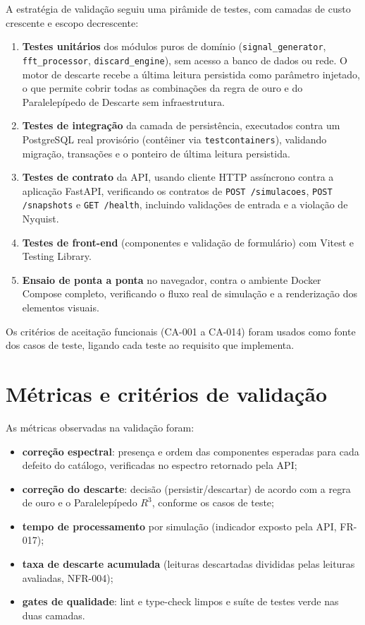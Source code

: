 A estratégia de validação seguiu uma pirâmide de testes, com camadas de custo
crescente e escopo decrescente:

\begin{enumerate}
  \item \textbf{Testes unitários} dos módulos puros de domínio
  (\texttt{signal\_generator}, \texttt{fft\_processor}, \texttt{discard\_engine}), sem acesso a banco
  de dados ou rede. O motor de descarte recebe a última leitura persistida como
  parâmetro injetado, o que permite cobrir todas as combinações da regra de ouro
  e do Paralelepípedo de Descarte sem infraestrutura.
  \item \textbf{Testes de integração} da camada de persistência, executados
  contra um PostgreSQL real provisório (contêiner via \texttt{testcontainers}),
  validando migração, transações e o ponteiro de última leitura persistida.
  \item \textbf{Testes de contrato} da API, usando cliente HTTP assíncrono
  contra a aplicação FastAPI, verificando os contratos de \texttt{POST /simulacoes},
  \texttt{POST /snapshots} e \texttt{GET /health}, incluindo validações de entrada e a
  violação de Nyquist.
  \item \textbf{Testes de front-end} (componentes e validação de formulário)
  com Vitest e Testing Library.
  \item \textbf{Ensaio de ponta a ponta} no navegador, contra o ambiente
  Docker Compose completo, verificando o fluxo real de simulação e a renderização
  dos elementos visuais.
\end{enumerate}

Os critérios de aceitação funcionais (CA-001 a CA-014) foram usados como
fonte dos casos de teste, ligando cada teste ao requisito que implementa.

\section{Métricas e critérios de validação}

As métricas observadas na validação foram:

\begin{itemize}
  \item \textbf{correção espectral}: presença e ordem das componentes
  esperadas para cada defeito do catálogo, verificadas no espectro retornado
  pela API;
  \item \textbf{correção do descarte}: decisão (persistir/descartar) de acordo
  com a regra de ouro e o Paralelepípedo \(R^3\), conforme os casos de teste;
  \item \textbf{tempo de processamento} por simulação (indicador exposto pela
  API, FR-017);
  \item \textbf{taxa de descarte acumulada} (leituras descartadas divididas
  pelas leituras avaliadas, NFR-004);
  \item \textbf{gates de qualidade}: lint e type-check limpos e suíte de
  testes verde nas duas camadas.
\end{itemize}

